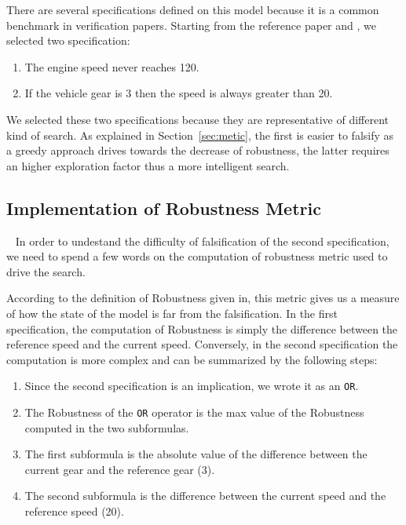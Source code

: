 \documentclass[11pt]{article}
\begin{document}
There are several specifications defined on this model because it is a common benchmark in verification papers. Starting from the reference paper and \cite{bardh2014benchmarks}, we selected two           specification:

\begin{enumerate}
    \item The engine speed never reaches 120.
    \item If the vehicle gear is 3 then the speed is always greater than 20.
\end{enumerate}

We selected these two specifications because they are representative of different kind of search.
As explained in Section~\ref{sec:metic}, the first is easier to falsify as a greedy approach drives towards the decrease of robustness, the latter requires an higher exploration factor thus a more intelligent search.

\subsection{Implementation of Robustness Metric}~\label{sec:metic}
In order to undestand the difficulty of falsification of the second specification, we need to spend a few words on the computation of robustness metric used to drive the search.

According to the definition of Robustness given in\cite{fainekos2006robustness}, this metric gives us a measure of how the state of the model is far from the falsification. In the first specification,    the computation of Robustness is simply the difference between the reference speed and the current speed. Conversely, in the second specification the computation is more complex and can be summarized by  the following steps:

\begin{enumerate}
\item Since the second specification is an implication, we wrote it as an \texttt{OR}.
\item The Robustness of the \texttt{OR} operator is the max value of the Robustness computed in the two subformulas.
\item The first subformula is the absolute value of the difference between the current gear and the reference gear (3).
\item The second subformula is the difference between the current speed and the reference speed (20).
\end{enumerate}
\end{document}
